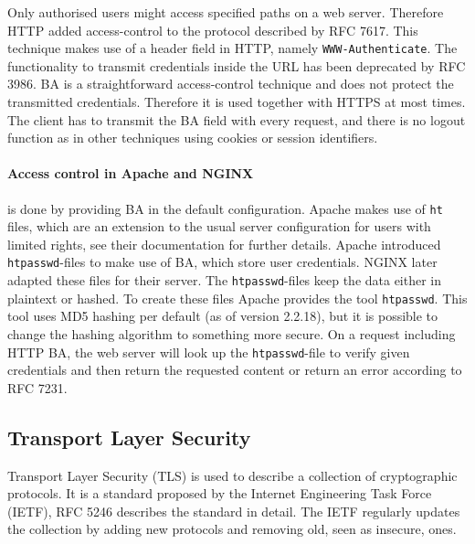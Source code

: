Only authorised users might access specified paths on a web server. Therefore
HTTP added access-control to the protocol described by RFC 7617\cite{rfc7617}.
This technique makes use of a header field in HTTP, namely
\texttt{WWW-Authenticate}. The functionality to transmit credentials inside the
URL has been deprecated by RFC 3986\cite{rfc3986}. BA is a straightforward
access-control technique and does not protect the transmitted credentials.
Therefore it is used together with HTTPS at most times. The client has to
transmit the BA field with every request, and there is no logout function as in
other techniques using cookies or session identifiers.

\paragraph{Access control in Apache and NGINX} is done by providing BA in the
default configuration. Apache makes use of \texttt{ht} files, which
are an extension to the usual server configuration for users with limited
rights, see their documentation\cite{apacheauthdoc} for further details. Apache
introduced \texttt{htpasswd}-files to make use of BA, which store user
credentials. NGINX later adapted these files for their server. The
\texttt{htpasswd}-files keep the data either in plaintext or hashed. To create
these files Apache provides the tool \texttt{htpasswd}\cite{htpasswddoc}. This
tool uses MD5 hashing per default (as of version 2.2.18), but it is possible to
change the hashing algorithm to something more secure. On a request including
HTTP BA, the web server will look up the \texttt{htpasswd}-file to verify given
credentials and then return the requested content or return an error according
to RFC 7231\cite{rfc7231}.

\subsection{Transport Layer Security}

Transport Layer Security (TLS) is used to describe a collection of cryptographic
protocols. It is a standard proposed by the Internet Engineering Task Force
(IETF), RFC 5246\cite{rfc5246} describes the standard in detail. The IETF
regularly updates the collection by adding new protocols and removing old, seen
as insecure, ones.

